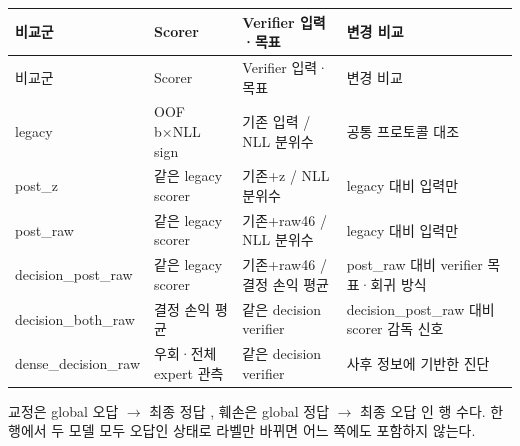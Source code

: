 \begin{longtable}{>{\raggedright\arraybackslash}p{}>{\raggedright\arraybackslash}p{}>{\raggedright\arraybackslash}p{}>{\raggedright\arraybackslash}p{}}
\toprule
비교군 & Scorer & Verifier 입력·목표 & 변경 비교 \\ \midrule
\endfirsthead
비교군 & Scorer & Verifier 입력·목표 & 변경 비교 \\ \midrule
\endhead
{}legacy & OOF b×NLL sign & 기존 입력 /\allowbreak{} NLL 분위수 & 공통 프로토콜 대조 \\
{}post\_\allowbreak{}z & 같은 legacy scorer & 기존+\allowbreak{}z /\allowbreak{} NLL 분위수 & legacy 대비 입력만 \\
{}post\_\allowbreak{}raw & 같은 legacy scorer & 기존+\allowbreak{}raw46 /\allowbreak{} NLL 분위수 & legacy 대비 입력만 \\
{}decision\_\allowbreak{}post\_\allowbreak{}raw & 같은 legacy scorer & 기존+\allowbreak{}raw46 /\allowbreak{} 결정 손익 평균 & post\_\allowbreak{}raw 대비 verifier 목표·회귀 방식 \\
{}decision\_\allowbreak{}both\_\allowbreak{}raw & 결정 손익 평균 & 같은 decision verifier & decision\_\allowbreak{}post\_\allowbreak{}raw 대비 scorer 감독 신호 \\
{}dense\_\allowbreak{}decision\_\allowbreak{}raw & 우회·전체 expert 관측 & 같은 decision verifier & 사후 정보에 기반한 진단 \\
\bottomrule
\end{longtable}
\endgroup
교정은 global 오답  \ensuremath{\rightarrow}  최종 정답 , 훼손은 global 정답  \ensuremath{\rightarrow}  최종 오답 인 행 수다. 한 행에서 두 모델 모두 오답인 상태로 라벨만 바뀌면 어느 쪽에도 포함하지 않는다.

